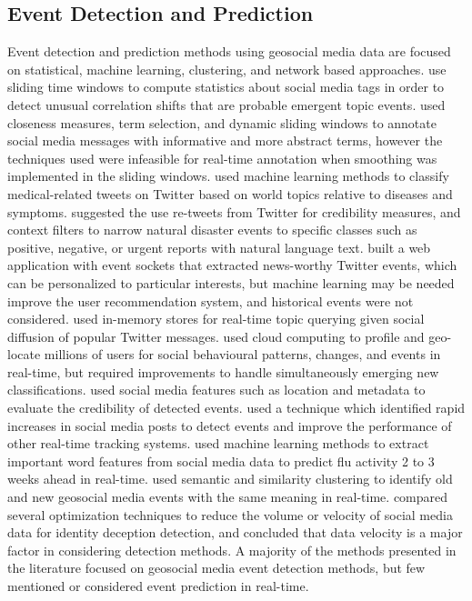 \subsection{Event Detection and Prediction} \label{event-detection}

 Event detection and prediction methods using geosocial media data are focused on statistical, machine learning, clustering, and network based approaches. \cite{Alvanaki:2012} use sliding time windows to compute statistics about social media tags in order to detect unusual correlation shifts that are probable emergent topic events. \cite{Khabiri:2012} used closeness measures, term selection, and dynamic sliding windows to annotate social media messages with informative and more abstract terms, however the techniques used were infeasible for real-time annotation when smoothing was implemented in the sliding windows. \cite{Sofean:2012} used machine learning methods to classify medical-related tweets on Twitter based on world topics relative to diseases and symptoms. \cite{Middleton:2014} suggested the use re-tweets from Twitter for credibility measures, and context filters to narrow natural disaster events to specific classes such as positive, negative, or urgent reports with natural language text. \cite{Hazra:2015} built a web application with event sockets that extracted news-worthy Twitter events, which can be personalized to particular interests, but machine learning may be needed improve the user recommendation system, and historical events were not considered. \cite{Enoki:2015} used in-memory stores for real-time topic querying given social diffusion of popular Twitter messages. \cite{Abrol:2015} used cloud computing to profile and geo-locate millions of users for social behavioural patterns, changes, and events in real-time, but required improvements to handle simultaneously emerging new classifications. \cite{Buntain:2015} used social media features such as location and metadata to evaluate the credibility of detected events. \cite{Buntain:2016} used a technique which identified rapid increases in social media posts to detect events and improve the performance of other real-time tracking systems. \cite{Lee:2017} used machine learning methods to extract important word features from social media data to predict flu activity 2 to 3 weeks ahead in real-time. \cite{Li:2017} used semantic and similarity clustering to identify old and new geosocial media events with the same meaning in real-time. \cite{Tsikerdekis:2017} compared several optimization techniques to reduce the volume or velocity of social media data for identity deception detection, and concluded that data velocity is a major factor in considering detection methods. A majority of the methods presented in the literature focused on geosocial media event detection methods, but few mentioned or considered event prediction in real-time.


